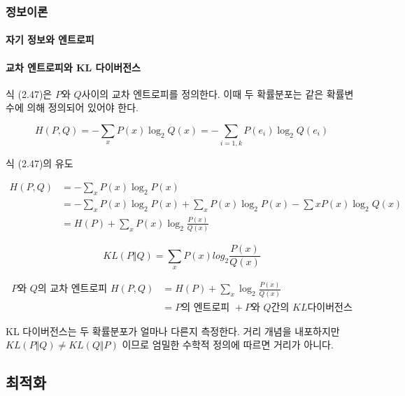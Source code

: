 \documentclass [12pt] {oblivoir}
\let\oldsubsubsection=\subsubsection
\renewcommand{\subsubsection}
{
  \filbreak
  \oldsubsubsection
}
\begin{document}
\subsubsection{정보이론}

\paragraph*{자기 정보와 엔트로피}\mbox{}

\paragraph*{교차 엔트로피와 KL 다이버전스}\mbox{}

식 (2.47)은 $P$와 $Q$사이의 교차 엔트로피를 정의한다. 이때 두 확률분포는 같은 확률변수에 의해 정의되어 있어야 한다.

\begin{equation} \tag{2.47}
  H(P, Q) = -\sum_{x}P(x)\log_{2}Q(x) = -\sum_{i=1,k}P(e_{i})\log_{2}Q(e_{i})
\end{equation}

식 (2.47)의 유도

\begin{align*}
  H(P, Q) &= -\sum_{x}P(x)\log_{2}P(x) \\
          &= -\sum_{x}P(x)\log_{2}P(x) + \sum_{x}P(x)\log_{2}P(x) - \sum{x}P(x)\log_{2}Q(x) \\
          &= H(P) + \sum_{x}P(x)\log_{2}\frac{P(x)}{Q(x)}
\end{align*}

\begin{equation} \tag{2.48}
  KL(P \Vert Q) = \sum_{x}P(x)log_{2}\frac{P(x)}{Q(x)}
\end{equation}

\begin{align} \tag{2.49}
  P\text{와 } Q\text{의 교차 엔트로피 } H(P, Q)
  &= H(P) + \sum_{x}\log_{2}\frac{P(x)}{Q(x)} \\
  &= P\text{의 엔트로피 } + P\text{와 } Q\text{간의 } KL\text{다이버전스}
\end{align}

KL 다이버전스는 두 확률분포가 얼마나 다른지 측정한다. 거리 개념을 내포하지만 $KL(P \Vert Q) \neq KL(Q \Vert P)$ 이므로 엄밀한 수학적 정의에 따르면 거리가 아니다.

\vspace{3mm}

\subsection{최적화}
\end{document}
